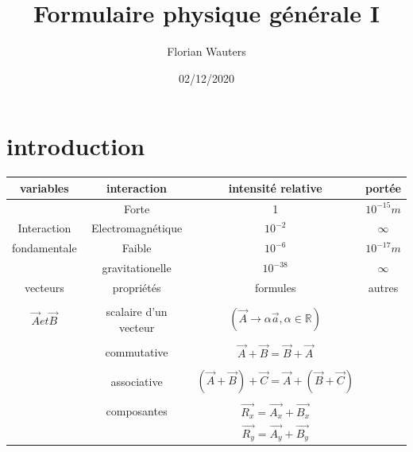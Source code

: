 \documentclass[]{article}
\newcommand{\R}{\mathbb{R}}
\begin{document}
\title{Formulaire physique générale I}
\author{Florian Wauters}
\date{02/12/2020}
\maketitle

\part{introduction}

\begin{tabular}{|c|c|c|c|}
\hline
variables & interaction  & intensité relative & portée \\
\hline
& Forte & 1 & $10^{-15}m$\\
Interaction& Electromagnétique & $10^{-2}$ & $\infty$\\
fondamentale& Faible & $10^{-6}$ & $10^{-17}m$\\
& gravitationelle & $10^{-38}$ & $\infty$\\
\hline

vecteurs & propriétés & formules & autres\\
\hline
&&&\\
$\overrightarrow{A} et \overrightarrow{B}$ & scalaire d'un vecteur & $(\overrightarrow{A} \rightarrow \alpha \overrightarrow{a}, \alpha \in \R)$&\\

&&&\\
& commutative & $\overrightarrow{A} + \overrightarrow{B} = \overrightarrow{B} + \overrightarrow{A}$&\\
&&&\\
& associative & $(\overrightarrow{A}+\overrightarrow{B})+\overrightarrow{C} = \overrightarrow{A}+(\overrightarrow{B}+\overrightarrow{C})$ &\\
&&&\\
& composantes & $\overrightarrow{R_{x}} = \overrightarrow{A_{x}}+\overrightarrow{B_{x}}$&\\

& & $\overrightarrow{R_{y}} = \overrightarrow{A_{y}}+\overrightarrow{B_{y}}$ &\\


\end{tabular}
\end{document}
